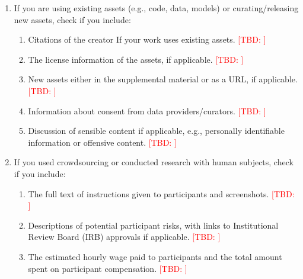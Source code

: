 \documentclass[twoside]{article}
\newcommand{\TBD}[1]{\textcolor{red}{[TBD\ifx\relax#1\relax\else: #1\fi]}}
\begin{document}
\begin{enumerate}
  \item If you are using existing assets (e.g., code, data, models) or curating/releasing new assets, check if you include:
  \begin{enumerate}
    \item Citations of the creator If your work uses existing assets. \TBD{}
    \item The license information of the assets, if applicable. \TBD{}
    \item New assets either in the supplemental material or as a URL, if applicable. \TBD{}
    \item Information about consent from data providers/curators. \TBD{}
    \item Discussion of sensible content if applicable, e.g., personally identifiable information or offensive content. \TBD{}
  \end{enumerate}

  \item If you used crowdsourcing or conducted research with human subjects, check if you include:
  \begin{enumerate}
    \item The full text of instructions given to participants and screenshots. \TBD{}
    \item Descriptions of potential participant risks, with links to Institutional Review Board (IRB) approvals if applicable. \TBD{}
    \item The estimated hourly wage paid to participants and the total amount spent on participant compensation. \TBD{}
  \end{enumerate}

\end{enumerate}
\end{document}

